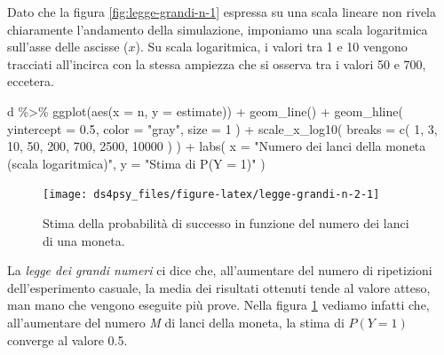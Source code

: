 \documentclass[
  11pt,
]{krantz}
\makeatletter
\newenvironment{Shaded}{\begin{snugshade}}{\end{snugshade}}
\newcommand{\AttributeTok}[1]{\textcolor[rgb]{0.61,0.61,0.61}{#1}}
\newcommand{\DecValTok}[1]{\textcolor[rgb]{0.06,0.06,0.06}{#1}}
\newcommand{\FloatTok}[1]{\textcolor[rgb]{0.06,0.06,0.06}{#1}}
\newcommand{\FunctionTok}[1]{\textcolor[rgb]{0,0,0}{#1}}
\newcommand{\NormalTok}[1]{#1}
\newcommand{\SpecialCharTok}[1]{\textcolor[rgb]{0,0,0}{#1}}
\newcommand{\StringTok}[1]{\textcolor[rgb]{0.5,0.5,0.5}{#1}}
\newenvironment{kframe}{%
\medskip{}
\setlength{\fboxsep}{.8em}
 \def\at@end@of@kframe{}%
 \ifinner\ifhmode%
  \def\at@end@of@kframe{\end{minipage}}%
  \begin{minipage}{\columnwidth}%
 \fi\fi%
 \def\FrameCommand##1{\hskip\@totalleftmargin \hskip-\fboxsep
 \colorbox{shadecolor}{##1}\hskip-\fboxsep
     \hskip-\linewidth \hskip-\@totalleftmargin \hskip\columnwidth}%
 \MakeFramed {\advance\hsize-\width
   \@totalleftmargin\z@ \linewidth\hsize
   \@setminipage}}%
 {\par\unskip\endMakeFramed%
 \at@end@of@kframe}
\renewenvironment{Shaded}{\begin{kframe}}{\end{kframe}}
\theoremstyle{definition}
\theoremstyle{definition}
\theoremstyle{definition}
\theoremstyle{definition}
\theoremstyle{remark}
\makeatother
\begin{document}
Dato che la figura \ref{fig:legge-grandi-n-1} espressa su una scala lineare non rivela chiaramente l'andamento della simulazione, imponiamo una scala logaritmica sull'asse delle ascisse (\(x\)). Su scala logaritmica, i valori tra 1 e 10 vengono tracciati all'incirca con la stessa ampiezza che si osserva tra i valori 50 e 700, eccetera.

\begin{Shaded}
\begin{Highlighting}[]
\NormalTok{d }\SpecialCharTok{\%\textgreater{}\%}
  \FunctionTok{ggplot}\NormalTok{(}\FunctionTok{aes}\NormalTok{(}\AttributeTok{x =}\NormalTok{ n, }\AttributeTok{y =}\NormalTok{ estimate)) }\SpecialCharTok{+}
  \FunctionTok{geom\_line}\NormalTok{() }\SpecialCharTok{+}
  \FunctionTok{geom\_hline}\NormalTok{(}
    \AttributeTok{yintercept =} \FloatTok{0.5}\NormalTok{, }\AttributeTok{color =} \StringTok{"gray"}\NormalTok{, }\AttributeTok{size =} \DecValTok{1}
\NormalTok{  ) }\SpecialCharTok{+}
  \FunctionTok{scale\_x\_log10}\NormalTok{(}
    \AttributeTok{breaks =} \FunctionTok{c}\NormalTok{(}
      \DecValTok{1}\NormalTok{, }\DecValTok{3}\NormalTok{, }\DecValTok{10}\NormalTok{, }\DecValTok{50}\NormalTok{, }\DecValTok{200}\NormalTok{,}
      \DecValTok{700}\NormalTok{, }\DecValTok{2500}\NormalTok{, }\DecValTok{10000}
\NormalTok{    )}
\NormalTok{  ) }\SpecialCharTok{+}
  \FunctionTok{labs}\NormalTok{(}
    \AttributeTok{x =} \StringTok{"Numero dei lanci della moneta (scala logaritmica)"}\NormalTok{,}
    \AttributeTok{y =} \StringTok{"Stima di P(Y = 1)"}
\NormalTok{  )}
\end{Highlighting}
\end{Shaded}

\begin{figure}

{\centering \texttt{[image: ds4psy\_files/figure-latex/legge-grandi-n-2-1]} 

}

\caption{Stima della probabilità di successo in funzione del numero dei lanci di una moneta.}\label{fig:legge-grandi-n-2}
\end{figure}

La \emph{legge dei grandi numeri} ci dice che, all'aumentare del numero di ripetizioni dell'esperimento casuale, la media dei risultati ottenuti tende al valore atteso, man mano che vengono eseguite più prove. Nella figura \ref{fig:legge-grandi-n-2} vediamo infatti che, all'aumentare del numero \emph{M} di lanci della moneta, la stima di \(P(Y = 1)\) converge al valore 0.5.
\end{document}
